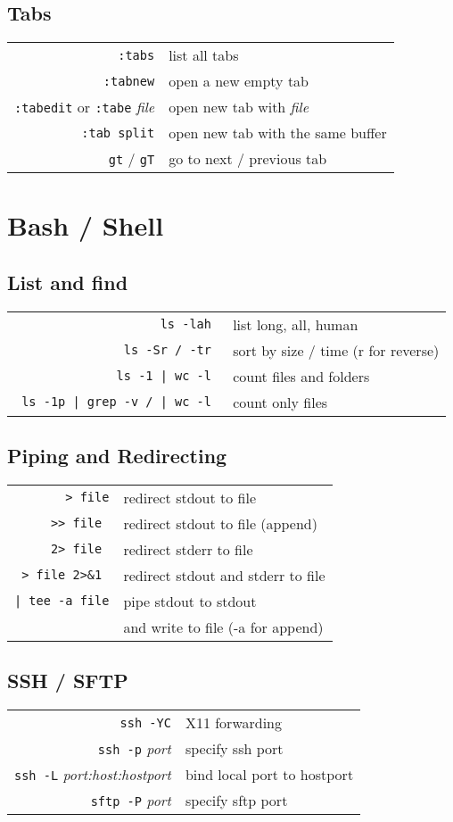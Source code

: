 \begin{multicols*}{3}
\subsection*{Tabs}
\begin{tabular}{@{}rl@{}}
  \verb|:tabs| & list all tabs \\
  \verb|:tabnew| & open a new empty tab \\
  \verb|:tabedit| or \verb|:tabe| \itshape{file} & open new tab with \itshape{file} \\
  \verb|:tab split| & open new tab with the same buffer \\
  \verb|gt| / \verb|gT| & go to next / previous tab
\end{tabular}
\vfill\null
\columnbreak

\section*{Bash / Shell}
\subsection*{List and find}
\begin{tabular}{@{}rl@{}}
\verb| ls -lah | & list long, all, human \\
\verb| ls -Sr / -tr | & sort by size / time (r for reverse) \\
\verb= ls -1 | wc -l = & count files and folders \\
\verb= ls -1p | grep -v / | wc -l = & count only files
\end{tabular}
\subsection*{Piping and Redirecting}
\begin{tabular}{@{}rl@{}}
\verb|> file| & redirect stdout to file \\
\verb|>> file | & redirect stdout to file (append) \\
\verb|2> file | & redirect stderr to file \\
\verb|> file 2>&1 | & redirect stdout and stderr to file \\
\verb=| tee -a file= & pipe stdout to stdout \\ & and write to file (-a for append) \\
\end{tabular}
\subsection*{SSH / SFTP}
\begin{tabular}{@{}rl@{}}
  \verb|ssh -YC| & X11 forwarding \\
  \verb|ssh -p| \itshape{port} & specify ssh port \\
  \verb|ssh -L| \itshape{port:host:hostport} & bind local port to hostport \\
  \verb|sftp -P| \itshape{port} & specify sftp port
\end{tabular}

\end{multicols*}
